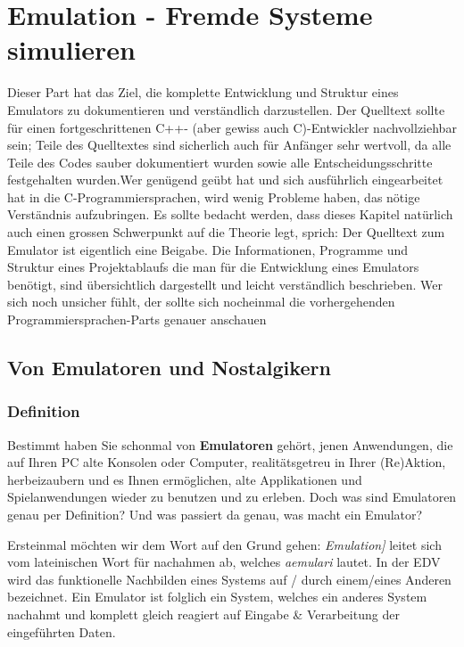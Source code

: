 \documentclass[b5paper,10pt,dvips,fleqn,titlepage,twoside]{book}
\begin{document}
\part{Emulation - Fremde Systeme simulieren}
Dieser Part hat das Ziel, die komplette Entwicklung und Struktur eines Emulators zu dokumentieren und verständlich darzustellen. Der Quelltext sollte für einen fortgeschrittenen C++- (aber gewiss auch C)-Entwickler nachvollziehbar sein; Teile des Quelltextes sind sicherlich auch für Anfänger sehr wertvoll, da alle Teile des Codes sauber dokumentiert wurden sowie alle Entscheidungsschritte festgehalten wurden.\newline Wer genügend geübt hat und sich ausführlich eingearbeitet hat in die C-Programmiersprachen, wird wenig Probleme haben, das nötige Verständnis aufzubringen.\newline
Es sollte bedacht werden, dass dieses Kapitel natürlich auch einen grossen Schwerpunkt auf die Theorie legt, sprich: Der Quelltext zum Emulator ist eigentlich eine Beigabe. Die Informationen, Programme und Struktur eines Projektablaufs die man für die Entwicklung eines Emulators benötigt, sind übersichtlich dargestellt und leicht verständlich beschrieben. Wer sich noch unsicher fühlt, der sollte sich nocheinmal die vorhergehenden Programmiersprachen-Parts genauer anschauen
\newpage
\chapter{Von Emulatoren und Nostalgikern}
\section{Definition}
Bestimmt haben Sie schonmal von \textbf{Emulatoren} gehört, jenen Anwendungen, die auf Ihren PC alte Konsolen oder Computer, realitätsgetreu in Ihrer (Re)Aktion, herbeizaubern und es Ihnen ermöglichen, alte Applikationen und Spielanwendungen wieder zu benutzen und zu erleben. Doch was sind Emulatoren genau per Definition? Und was passiert da genau, was macht ein Emulator?\newline

Ersteinmal möchten wir dem Wort auf den Grund gehen: \emph{Emulation]} leitet sich vom lateinischen Wort für nachahmen ab, welches \emph{aemulari} lautet.
In der EDV wird das funktionelle Nachbilden eines Systems auf / durch einem/eines Anderen bezeichnet. Ein Emulator ist folglich ein System, welches ein anderes System nachahmt und komplett gleich reagiert auf Eingabe \& Verarbeitung der eingeführten Daten.
\end{document}
